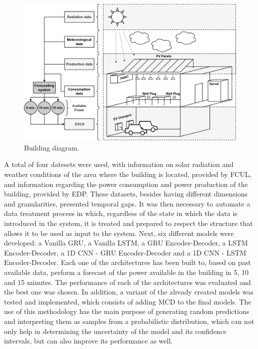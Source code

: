 \begin{figure}[h!]
    \centering
    \begin{center}
    \includegraphics[width=1\textwidth]{Images/BUILDING.png}
    \caption{Building diagram.}
    \label{building}
    \end{center}
\end{figure}


A total of four datesets were used, with information on solar radiation and weather conditions of the area where the building is located, provided by \ac{FCUL}, and information regarding the power consumption and power production of the building, provided by \ac{EDP}. These datasets, besides having different dimensions and granularities, presented temporal gaps. It was then necessary to automate a data treatment process in which, regardless of the state in which the data is introduced in the system, it is treated and prepared to respect the structure that allows it to be used as input to the system. Next, six different models were developed: a Vanilla \ac{GRU}, a Vanilla \ac{LSTM}, a \ac{GRU} Encoder-Decoder, a \ac{LSTM} Encoder-Decoder, a \ac{1D CNN} - \ac{GRU} Encoder-Decoder and a \ac{1D CNN} - \ac{LSTM} Encoder-Decoder. Each one of the architectures has been built to, based on past available data, perform a forecast of the power available in the building in 5, 10 and 15 minutes. The performance of each of the architectures was evaluated and the best one was chosen. In addition, a variant of the already created models was tested and implemented, which consists of adding \ac{MCD} to the final models. The use of this methodology has the main purpose of generating random predictions and interpreting them as samples from a probabilistic distribution, which can not only help in determining the uncertainty of the model and its confidence intervals, but can also improve its performance as well. 

